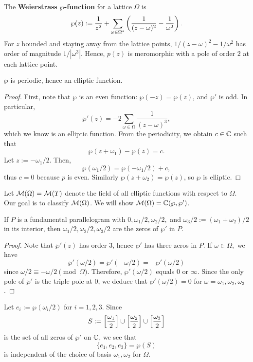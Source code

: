 \documentclass[11pt]{article}
\begin{document}
\begin{defn}
    The \textbf{Weierstrass $\bm {\wp}$-function} for a lattice $\Omega$ is
    $$\wp(z) := \frac{1}{z^2} + \sum_{\omega \in \Omega^*}\left ( \frac{1}{(z-\omega)^2}-\frac{1}{\omega^2} \right ).$$
    For $z$ bounded and staying away from the lattice points, $1/(z-\omega)^2 - 1/\omega^2$ has order of magnitude $1/|\omega^3|$. Hence, $p(z)$ is meromorphic with a pole of order $2$ at each lattice point.
\end{defn}

\begin{thm}
    $\wp$ is periodic, hence an elliptic function.
\end{thm}

\begin{proof}
    First, note that $\wp$ is an even function: $\wp(-z)=\wp(z)$, and $\wp'$ is odd. In particular,
    $$\wp'(z) = -2\sum_{\omega \in \Omega}\frac{1}{(z-\omega)^3},$$
    which we know is an elliptic function. From the periodicity, we obtain $c \in \mathbb{C}$ such that
    $$\wp(z+\omega_1) - \wp(z) =c.$$
    Let $z:=-\omega_1/2$. Then,
    $$\wp(\omega_1/2) = \wp(-\omega_1/2) + c,$$
    thus $c=0$ because $p$ is even. Similarly $\wp(z+\omega_2)=\wp(z)$, so $\wp$ is elliptic.
\end{proof}

Let $\mathcal M(\Omega) = \mathcal M(T)$ denote the field of all elliptic functions with respect to $\Omega$. Our goal is to classify $\mathcal M(\Omega)$. We will show $\mathcal M(\Omega) =\mathbb{C} (\wp, \wp')$.

\begin{thm}
    If $P$ is a fundamental parallelogram with $0,\omega_1/2,\omega_2/2,$ and $\omega_3/2:=(\omega_1+\omega_2)/2$ in its interior, then
    $\omega_1/2,\omega_2/2,\omega_3/2$ are the zeros of $\wp'$ in $P$.
\end{thm}

\begin{proof}
    Note that $\wp'(z)$ has order $3$, hence $\wp'$ has three zeros in $P$. If $\omega \in \Omega,$ we have
    $$\wp '(\omega/2) = \wp'(-\omega/2) = -\wp'(\omega/2)$$
    since $\omega/2 \equiv -\omega/2 \pmod \Omega$. Therefore, $\wp'(\omega/2)$ equals $0$ or $\infty$. Since the only pole of $\wp'$ is the triple pole at $0$, we deduce that $\wp'(\omega/2)=0$ for $\omega =\omega_1,\omega_2,\omega_3$.
\end{proof}


\begin{rmk}
  Let $e_i := \wp (\omega_i/2)$ for $i=1,2,3$. Since 
  $$S := \left [ \frac{\omega_1}{2} \right ] \cup \left [ \frac{\omega_2}{2} \right ] \cup \left [ \frac{\omega_3}{2} \right ]$$
  is the set of all zeros of $\wp'$ on $\mathbb{C}$, we see that
  $$\{e_1,e_2,e_3\} = \wp(S)$$
  is independent of the choice of basis $\omega_1,\omega_2$ for $\Omega$.
\end{rmk}
\end{document}
